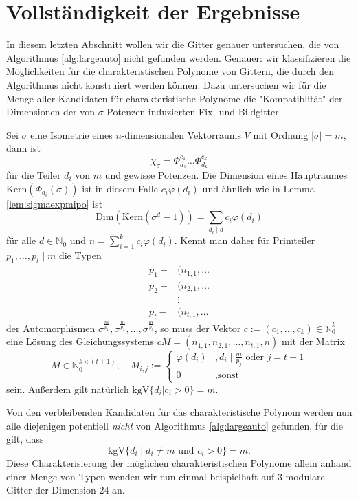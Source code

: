 \documentclass[12pt,a4paper,halfparskip,headsepline,bibtotocnumbered]{scrreprt}
\theoremstyle{nummermitklammern}
\theoremstyle{nonumberbreak}
\newcommand{\N}{\mathbb{N}}
\newcommand{\Kern}{\text{Kern}}
\newcommand{\kgV}{\text{kgV}}
\newcommand{\Dim}{\text{Dim}}
\begin{document}
\section{Vollständigkeit der Ergebnisse}

In diesem letzten Abschnitt wollen wir die Gitter genauer untersuchen, die von Algorithmus \eqref{alg:largeauto} nicht gefunden werden. Genauer: wir klassifizieren die Möglichkeiten für die charakteristischen Polynome von Gittern, die durch den Algorithmus nicht konstruiert werden können. Dazu untersuchen wir für die Menge aller Kandidaten für charakteristische Polynome die "Kompatiblität" der Dimensionen der von $\sigma$-Potenzen induzierten Fix- und Bildgitter.\par
Sei $\sigma$ eine Isometrie eines $n$-dimensionalen Vektorraums $V$ mit Ordnung $\vert \sigma \vert = m$, dann ist
	\[\chi_\sigma = \Phi_{d_1}^{c_1} \dots \Phi_{d_k}^{c_k} \]
für die Teiler $d_i$ von $m$ und gewisse Potenzen. Die Dimension eines Hauptraumes $\Kern(\Phi_{d_i}(\sigma))$ ist in diesem Falle $c_i \varphi(d_i)$ und ähnlich wie in Lemma \eqref{lem:sigmaexpmipo} ist
	\[ \Dim(\Kern(\sigma^d-1)) = \sum_{d_i \mid d} c_i \varphi(d_i) \]
für alle $d \in \N_0$ und $n = \sum_{i=1}^k c_i \varphi(d_i)$. Kennt man daher für Primteiler $p_1, \dots, p_t \mid m$ die Typen
\begin{align*}
	p_1 - &(n_{1,1}, \dots\\
	p_2 - &(n_{2,1}, \dots\\
	&\vdots\\
	p_t - &(n_{t,1}, \dots
\end{align*}
der Automorphismen $\sigma^\frac{m}{p_1}, \sigma^\frac{m}{p_2}, \dots, \sigma^\frac{m}{p_t}$, so muss der Vektor $c := (c_1, \dots, c_k) \in \N_0^k$ eine Lösung des Gleichungssystems $c M= (n_{1,1}, n_{2,1}, \dots, n_{t,1}, n)$ mit der Matrix
	\[M \in \N_0^{k \times (t+1)}, \quad M_{i,j} := \begin{cases} \varphi(d_i)	&, d_i \mid \frac{m}{p_j} \text{ oder } j = t+1\\ 0 &, \text{sonst}\end{cases}\]
sein. Außerdem gilt natürlich $\kgV\lbrace d_i \vert c_i > 0 \rbrace = m$.\par
Von den verbleibenden Kandidaten für das charakteristische Polynom werden nun alle diejenigen potentiell \textit{nicht} von Algorithmus \eqref{alg:largeauto} gefunden, für die gilt, dass
	\[\kgV \lbrace d_i \mid d_i \neq m \text{ und } c_i > 0 \rbrace = m.\]
Diese Charakterisierung der möglichen charakteristischen Polynome allein anhand einer Menge von Typen wenden wir nun einmal beispielhaft auf $3$-modulare Gitter der Dimension $24$ an.
\end{document}
